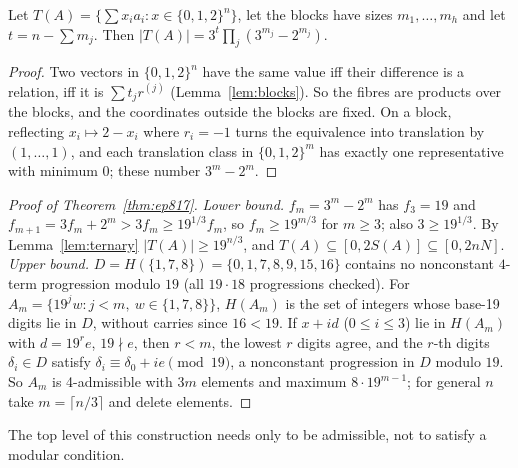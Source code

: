 \begin{lemma}\label{lem:ternary}
Let $T(A)=\{\sum x_ia_i:x\in\{0,1,2\}^n\}$, let the blocks have sizes $m_1,\dots,m_h$ and let $t=n-\sum m_j$. Then $|T(A)|=3^t\prod_j(3^{m_j}-2^{m_j})$.
\end{lemma}
\begin{proof}
Two vectors in $\{0,1,2\}^n$ have the same value iff their difference is a relation, iff it is $\sum t_jr^{(j)}$ (Lemma~\ref{lem:blocks}). So the fibres are products over the blocks, and the coordinates outside the blocks are fixed. On a block, reflecting $x_i\mapsto2-x_i$ where $r_i=-1$ turns the equivalence into translation by $(1,\dots,1)$, and each translation class in $\{0,1,2\}^m$ has exactly one representative with minimum $0$; these number $3^m-2^m$.
\end{proof}

\begin{proof}[Proof of Theorem~\ref{thm:ep817}]
\emph{Lower bound.} $f_m=3^m-2^m$ has $f_3=19$ and $f_{m+1}=3f_m+2^m>3f_m\ge19^{1/3}f_m$, so $f_m\ge19^{m/3}$ for $m\ge3$; also $3\ge19^{1/3}$. By Lemma~\ref{lem:ternary} $|T(A)|\ge19^{n/3}$, and $T(A)\subseteq[0,2S(A)]\subseteq[0,2nN]$.
\emph{Upper bound.} $D=H(\{1,7,8\})=\{0,1,7,8,9,15,16\}$ contains no nonconstant $4$-term progression modulo $19$ (all $19\cdot18$ progressions checked). For $A_m=\{19^jw:j<m,\ w\in\{1,7,8\}\}$, $H(A_m)$ is the set of integers whose base-19 digits lie in $D$, without carries since $16<19$. If $x+id$ ($0\le i\le3$) lie in $H(A_m)$ with $d=19^re$, $19\nmid e$, then $r<m$, the lowest $r$ digits agree, and the $r$-th digits $\delta_i\in D$ satisfy $\delta_i\equiv\delta_0+ie\pmod{19}$, a nonconstant progression in $D$ modulo $19$. So $A_m$ is 4-admissible with $3m$ elements and maximum $8\cdot19^{m-1}$; for general $n$ take $m=\lceil n/3\rceil$ and delete elements.
\end{proof}

The top level of this construction needs only to be admissible, not to satisfy a modular condition.


